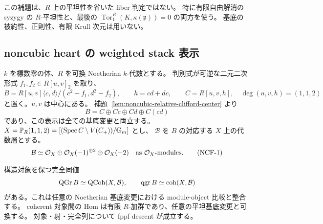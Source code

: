 \begin{remark}
この補題は、$R$ 上の平坦性を省いた fiber 判定ではない。
特に有限自由解消の syzygy の $R$-平坦性と、最後の
$\operatorname{Tor}_1^R(K,\kappa(\mathfrak p))=0$ の両方を使う。
基底の被約性、正則性、有限 Krull 次元は用いない。
\end{remark}

\subsection{noncubic heart の weighted stack 表示}

$k$ を標数零の体、$R$ を可換 Noetherian $k$-代数とする。
判別式が可逆な二元二次形式 $f_1,f_2\in R[u,v]_2$ を取り、
\[
 B=R[u,v]\langle c,d\rangle/(c^2-f_1,d^2-f_2),
 \qquad h=cd+dc,
 \qquad C=R[u,v,h],\quad\deg(u,v,h)=(1,1,2)
\]
と置く。$u,v$ は中心にある。
補題~\ref{lem:noncubic-relative-clifford-center} より
\[
 B=C\oplus Cc\oplus Cd\oplus C(cd)
\]
であり、この表示は全ての基底変更と両立する。
$X=\mathbb P_R(1,1,2)=[(\operatorname{Spec} C\setminus V(C_+))/\mathbb G_m]$ とし、
$\mathcal B$ を $B$ の対応する $X$ 上の代数層とする。
\[
 \mathcal B\simeq\mathcal O_X\oplus\mathcal O_X(-1)^{\oplus2}\oplus\mathcal O_X(-2)
 \quad\text{as }\mathcal O_X\text{-modules}.
 \tag{NCF-1}\label{eq:nc-clifford-sheaf}
\]

\begin{proposition}\label{prop:nc-qgr-weighted}
構造対象を保つ完全同値
\[
 \operatorname{QGr} B\simeq\operatorname{QCoh}(X,\mathcal B),\qquad
 \operatorname{qgr} B\simeq\operatorname{coh}(X,\mathcal B)
\]
がある。これは任意の Noetherian 基底変更における module-object 比較と整合する。
coherent 対象間の Hom は有限 $R$-加群であり、任意の平坦基底変更と可換する。
対象・射・完全列について fppf descent が成立する。
\end{proposition}

